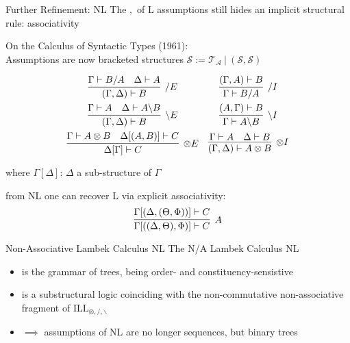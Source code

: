 \documentclass{beamer}
\begin{document}
\begin{frame}{Further Refinement: NL}
	\small
	The $,$ of L assumptions still hides an implicit structural rule:
	\pause
	associativity
	\vfill

	\pause
	\alert{On the Calculus of Syntactic Types (1961)}:\\
	
	Assumptions are now bracketed structures $\mathcal{S} := \mathcal{T}_\mathcal{A} \ | \ (\mathcal{S}, \mathcal{S})$
	\pause
		
	\[
	\begin{array}{cc}
		\vcenter{\infer[/ E]{(\Gamma, \Delta) \vdash B}{\Gamma \vdash B/A & \Delta \vdash A}}
		&
		\vspace{5pt}
		\vcenter{\infer[/ I]{\Gamma \vdash B/A}{(\Gamma, A) \vdash B}} \\		\vcenter{\infer[\backslash E]{(\Gamma, \Delta) \vdash B}{\Gamma \vdash A & \Delta \vdash A\backslash B}}
		\vspace{5pt}
		&
		\vcenter{\infer[\backslash I]{\Gamma \vdash A\backslash B}{(A, \Gamma) \vdash B}} \\
		\vcenter{\infer[\otimes E]{\Delta[\Gamma] \vdash C}{
			\Gamma \vdash A\otimes B
			&
			\Delta[(A, B)] \vdash C
		}}
		&
		\vcenter{\infer[\otimes I]{(\Gamma, \Delta) \vdash A\otimes B}{
			\Gamma \vdash A 
			&
			\Delta \vdash B
			}} \\
	\end{array}
	\]
	\begin{flushright}
		where $\Gamma[\Delta]$: $\Delta$ a sub-structure of $\Gamma$	
	\end{flushright}
	
	
	from NL one can recover L via explicit associativity:
	\[
		\infer[A]{\Gamma[((\Delta, \Theta), \Phi)] \vdash C}{
		\Gamma[(\Delta, (\Theta, \Phi))] \vdash C
		}
	\]
	\end{frame}
	
\begin{frame}{Non-Associative Lambek Calculus NL}
	\small
	\alert{The N/A Lambek Calculus NL}\\
	\begin{itemize}
	\item is the grammar of \alert{trees}, being order- and constituency-sensistive
	\item is a substructural logic coinciding with the non-commutative non-associative fragment of $\text{ILL}_{\otimes, /, \backslash}$
	\item[] $\implies$ assumptions of NL are no longer sequences, but \alert{binary trees}
	\end{itemize}
\end{frame}
\end{document}
